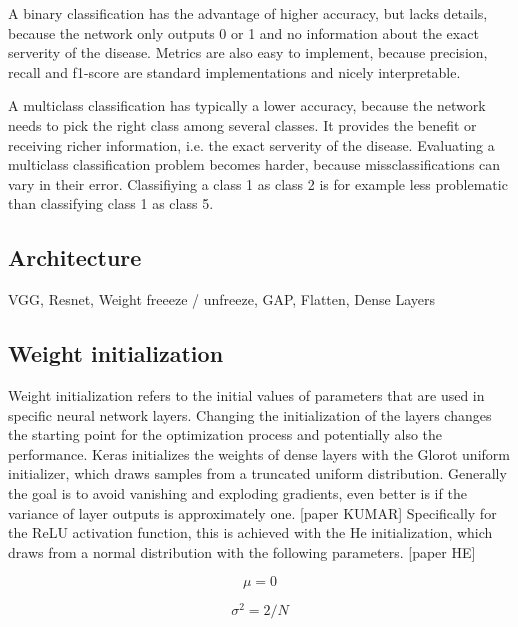 \documentclass{article}
\begin{document}
A binary classification has the advantage of higher accuracy, but lacks details, because the network only outputs 0 or 1
and no information about the exact serverity of the disease. Metrics are also easy to implement, because precision, 
recall and f1-score are standard implementations and nicely interpretable.

A multiclass classification has typically a lower accuracy, because the network needs to pick the right class among 
several classes. It provides the benefit or receiving richer information, i.e. the exact serverity of the disease.
Evaluating a multiclass classification problem becomes harder, because missclassifications can vary in their error.
Classifiying a class 1 as class 2 is for example less problematic than classifying class 1 as class 5.


\subsection{Architecture}
VGG, Resnet, Weight freeeze / unfreeze, GAP, Flatten, Dense Layers
\subsection{Weight initialization}
Weight initialization refers to the initial values of parameters that are used in specific neural network layers.
Changing the initialization of the layers changes the starting point for the optimization process and potentially also the performance.
Keras initializes the weights of dense layers with the Glorot uniform initializer, which draws samples from a truncated uniform distribution.
Generally the goal is to avoid vanishing and exploding gradients, even better is if the variance of layer outputs is approximately one. [paper KUMAR]
Specifically for the ReLU activation function, this is achieved with the He initialization, which draws from a normal distribution with the following parameters. [paper HE]\\
\begin{minipage}{.5\linewidth}
  \begin{equation}
    \mu = 0
  \end{equation}
\end{minipage}
\begin{minipage}{.5\linewidth}
  \begin{equation}
    \sigma^2 = 2/N
  \end{equation}
\end{minipage}
\end{document}
